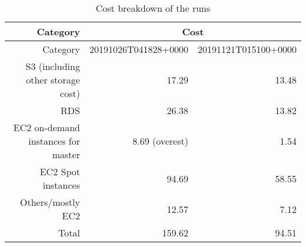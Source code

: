\begin{longtable} {|r|r|r|} 
\caption{Cost breakdown of the runs \label{tab:billBreakdown}}\\ 
\hline 
{Category}&\multicolumn{2}{c|}{Cost} \\ \hline 
{Category}&{20191026T041828+0000}&{20191121T015100+0000}\\ \hline 
{S3 (including other storage cost)}&17.29&13.48 \\
{RDS}&26.38&13.82\\
{EC2 on-demand instances for master}&8.69 (overest) &1.54\\
{EC2 Spot instances}&94.69&58.55\\
{Others/mostly EC2}&12.57 &7.12 \\ \hline
{Total}&159.62&94.51\\ \hline
\end{longtable} \normalsize
